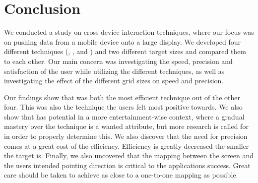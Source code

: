 \section{Conclusion}

We conducted a study on cross-device interaction techniques, where our focus was on pushing data from a mobile device onto a large display.
We developed four different techniques (\swipe, \tilt, \throw and \pinch) and two different target sizes and compared them to each other.
Our main concern was investigating the speed, precision and satisfaction of the user while utilizing the different techniques, as well as investigating the effect of the different grid sizes on speed and precision.  

Our findings show that \swipe was both the most efficient technique out of the other four.
This was also the technique the users felt most positive towards.
We also show that \pinch has potential in a more entertainment-wise context, where a gradual mastery over the technique is a wanted attribute, but more research is called for in order to properly determine this.
We also discover that the need for precision comes at a great cost of the efficiency.
Efficiency is greatly decreased the smaller the target is. 
Finally, we also uncovered that the mapping between the screen and the users intended pointing direction is critical to the applications success. 
Great care should be taken to achieve as close to a one-to-one mapping as possible. 